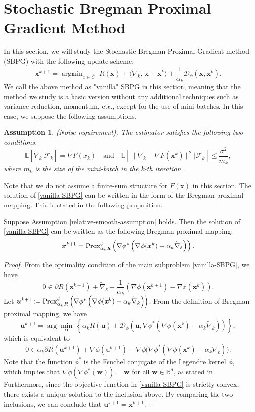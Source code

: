\documentclass[twoside,11pt]{article}
\newcommand{\R}{\mathbb R}
\newcommand{\E}{\mathbb{E}}
\newcommand{\cD}{\mathcal D}
\newcommand{\cF}{\mathcal F}
\newcommand{\wtnabla}{\widetilde\nabla}
\DeclareMathOperator*{\argmin}{argmin}
\def\inprod#1#2{\langle#1,\,#2\rangle}
\newtheorem{assumption}{Assumption}%
\def\vu{{\bm{u}}}
\def\vw{{\bm{w}}}
\def\vx{{\bm{x}}}
\begin{document}
\section{Stochastic Bregman Proximal Gradient Method}\label{section-vanilla-SBPG}
In this section, we will study the Stochastic Bregman Proximal Gradient method (SBPG) with the following update scheme:
\begin{equation}
{\vx^{k+1}}=\argmin_{x\in\overline{C}}\;R(\vx)+\inprod{\widetilde\nabla_k}{\vx-{\vx^k}}+\frac{1}{\alpha_k}\cD_\phi(\vx,{\vx^k}).
\label{vanilla-SBPG}
\end{equation}
We call {the above method as} "vanilla" SBPG in this section, meaning that the method we study is a basic version without any additional techniques such as variance reduction, momentum, etc., except for the use of mini-batches. In this case, we suppose the following assumptions.
\begin{assumption}\label{variance-assumption}
(Noise requirement).
The estimator satisfies the following two conditions:
$$\E[\widetilde{\nabla}_k|\cF_k]=\nabla F(x_k) \quad \text{and}\quad 
\mathbb E[\|\widetilde\nabla_k-\nabla F({\vx^k})\|^2|\cF_k]\leq\frac{\sigma^2}{m_k},$$ where $m_k$ is the size of the mini-batch in the $k$-th iteration.    
\end{assumption}
 {Note} that we do not assume a finite-sum structure for $F(\vx)$ in this section. The solution of \eqref{vanilla-SBPG} can be written in the form of the Bregman proximal mapping. This is stated in the following proposition. 
 \begin{proposition} 
  \label{subprob-closed-form-sol} 
 Suppose Assumption \ref{relative-smooth-assumption} holds. Then the solution of \eqref{vanilla-SBPG} can be written as the following Bregman proximal mapping:
 \[
 {\vx^{k+1}}={\rm Prox}^\phi_{\alpha_k R}\left(\nabla\phi^*\left(\nabla\phi({\vx^k})-\alpha_k\widetilde\nabla_k\right)\right).
 \]
 \end{proposition}
 \begin{proof}
From the optimality condition of the main subproblem \eqref{vanilla-SBPG}, we have
 \[
 0\in\partial R({\vx^{k+1}})+\wtnabla_k+\frac{1}{\alpha_k}\left(\nabla\phi({\vx^{k+1}})-\nabla\phi({\vx^k})\right).
 \]
Let $\vu^{k+1}:={\rm Prox}^\phi_{\alpha_k R}\left(\nabla\phi^*\left(\nabla\phi({\vx^k})-\alpha_k\widetilde\nabla_k\right)\right)$. From the definition of Bregman proximal mapping, we have
\[
\vu^{k+1}=\arg\min_\vu\;\left\{\alpha_kR(\vu)+{\cD_\phi}\left(\vu,\nabla\phi^*\left(\nabla\phi({\vx^k})-\alpha_k\widetilde\nabla_k\right)\right)\right\},
\]
which is equivalent to
\[
0\in\alpha_k\partial R(\vu^{k+1})+\nabla\phi(\vu^{k+1})-\nabla\phi\big(\nabla\phi^*(\nabla\phi({\vx^k})-\alpha_k\wtnabla_k)\big).
\]
Note that the function $\phi^*$ is the Fenchel conjugate of the Legendre kernel $\phi$, which implies that $\nabla\phi(\nabla\phi^*(\vw))=\vw$ for all $\vw\in\R^d$, as stated in \cite[Corollary 13.3.1, Theorem 26.5]{rockafellar1997convex}. Furthermore, since the objective function in \eqref{vanilla-SBPG} is strictly convex, there exists a unique solution to the inclusion above. By comparing the two inclusions, we can conclude that $\vu^{k+1}={\vx^{k+1}}$.
 \end{proof}
\end{document}
